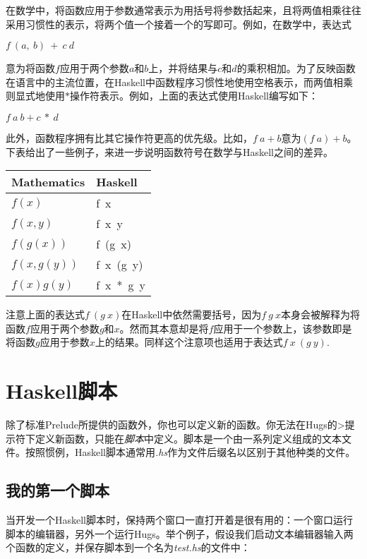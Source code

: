 在数学中，将函数应用于参数通常表示为用括号将参数括起来，且将两值相乘往往采用习惯性的表示，将两个值一个接着一个的写即可。例如，在数学中，表达式

\noindent\hspace*{1cm} $f~(a,~b)~+~c~d$

意为将函数$f$应用于两个参数$a$和$b$上，并将结果与$c$和$d$的乘积相加。为了反映函数在语言中的主流位置，在Haskell中函数程序习惯性地使用空格表示，而两值相乘则显式地使用$*$操作符表示。例如，上面的表达式使用Haskell编写如下：

\noindent\hspace*{1cm} $f~a~b + c~*~d$

此外，函数程序拥有比其它操作符更高的优先级。比如，$f~a + b$意为$(f~a) +
b$。下表给出了一些例子，来进一步说明函数符号在数学与Haskell之间的差异。

\begin{table}[htbp]
\label{tab:threesome}
\centering
\begin{tabular}{ll}
\hline
Mathematics & Haskell  \\
\hline
$f(x)$ & f~x \\
$f(x,y)$ & f~x~y \\
$f(g(x))$ & f~(g~x) \\
$f(x,g(y))$ & f~x~(g~y)\\
$f(x)g(y)$ & f~x~*~g~y\\
\hline
\end{tabular}
\end{table}

注意上面的表达式$f~(g~x)$在Haskell中依然需要括号，因为$f~g~
x$本身会被解释为将函数$f$应用于两个参数$g$和$x$。然而其本意却是将$f$应用于一个参数上，该参数即是将函数$g$应用于参数$x$上的结果。同样这个注意项也适用于表达式$f~x~(g~y)$.

\section{Haskell脚本}
除了标准Prelude所提供的函数外，你也可以定义新的函数。你无法在Hugs的>提示符下定义新函数，只能在\textit{脚本}中定义。脚本是一个由一系列定义组成的文本文件。按照惯例，Haskell脚本通常用\textit{.hs}作为文件后缀名以区别于其他种类的文件。

\subsection{我的第一个脚本}
当开发一个Haskell脚本时，保持两个窗口一直打开着是很有用的：一个窗口运行脚本的编辑器，另外一个运行Hugs。举个例子，假设我们启动文本编辑器输入两个函数的定义，并保存脚本到一个名为\textit{test.hs}的文件中：

